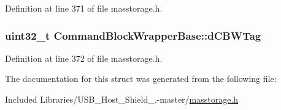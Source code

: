 \-Definition at line 371 of file masstorage.\-h.

\hypertarget{struct_command_block_wrapper_base_a0898a332eec2d598b80a896ff66d5549}{
\subsubsection[{d\-C\-B\-W\-Tag}]{\setlength{\rightskip}{0pt plus 5cm}uint32\-\_\-t {\bf \-Command\-Block\-Wrapper\-Base\-::d\-C\-B\-W\-Tag}}}\label{struct_command_block_wrapper_base_a0898a332eec2d598b80a896ff66d5549}


\-Definition at line 372 of file masstorage.\-h.



\-The documentation for this struct was generated from the following file\-:\begin{DoxyCompactItemize}
\item 
\-Included Libraries/\-U\-S\-B\-\_\-\-Host\-\_\-\-Shield\-\_.-\/master/\hyperlink{masstorage_8h}{masstorage.\-h}\end{DoxyCompactItemize}
